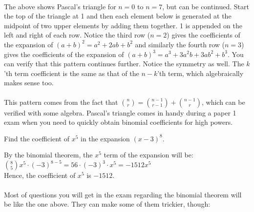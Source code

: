 \documentclass[12pt, a4paper, titlepage, twoside]{article}
\newcounter{excount}[subsection]
\begin{document}
	\paragraph{}
	The above shows Pascal's triangle for $n=0$ to $n=7$, but can be continued. Start the top of the triangle at 1 and then each element
	below is generated at the midpoint of two upper elements by adding them together. 1 is appended on the left and right of each row.
	Notice the third row ($n=2$) gives the coefficients of the expansion of $(a+b)^2 = a^2 + 2ab + b^2$ and similarly the fourth row
	($n=3$) gives the coefficients of the expansion of $(a+b)^3 = a^3 + 3a^2b + 3ab^2 + b^3$. You can verify that this pattern continues
	further. Notice the symmetry as well. The $k$'th term coefficient is the same as that of the $n-k$'th term, which algebraically makes
	sense too.
	
	\paragraph{}
	This pattern comes from the fact that $\displaystyle {n \choose r} = {{n-1} \choose {r-1}} + {{n-1} \choose r}$, which can be verified
	with some algebra. Pascal's triangle comes in handy during a paper 1 exam when you need to quickly obtain binomial coefficients for
	high powers.\\
	
	\begin{ex}
		Find the coefficient of $x^5$ in the expansion ${\left(x-3\right)}^8$.
		
		\hfill
		\tcbline
		\hfill
		
		By the binomial theorem, the $x^5$ term of the expansion will be:\\ 
		
		$\displaystyle {8 \choose 5} x^5 \cdot (-3)^{8-5} = 56 \cdot (-3)^{3} \cdot x^5 = -1512x^5$\\
		
		Hence, the coefficient of $x^5$ is $-1512$.
	\end{ex}
	
	\paragraph{}
	Most of questions you will get in the exam regarding the binomial theorem will be like the one above. They can make some of
	them trickier, though:\\
	
\end{document}
